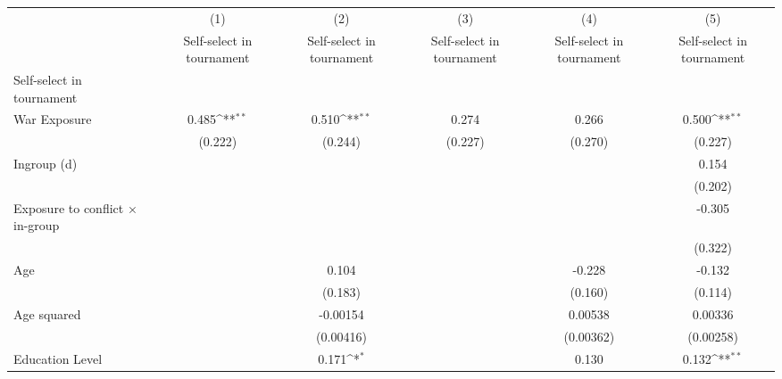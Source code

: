 {
\def\sym#1{\ifmmode^{#1}\else\(^{#1}\)\fi}
\begin{tabular}{l*{5}{c}}
\hline\hline
                    &\multicolumn{1}{c}{(1)}&\multicolumn{1}{c}{(2)}&\multicolumn{1}{c}{(3)}&\multicolumn{1}{c}{(4)}&\multicolumn{1}{c}{(5)}\\
                    &\multicolumn{1}{c}{Self-select in tournament}&\multicolumn{1}{c}{Self-select in tournament}&\multicolumn{1}{c}{Self-select in tournament}&\multicolumn{1}{c}{Self-select in tournament}&\multicolumn{1}{c}{Self-select in tournament}\\
\hline
Self-select in tournament&                     &                     &                     &                     &                     \\
War Exposure        &       0.485\sym{**} &       0.510\sym{**} &       0.274         &       0.266         &       0.500\sym{**} \\
                    &     (0.222)         &     (0.244)         &     (0.227)         &     (0.270)         &     (0.227)         \\
[1em]
Ingroup (d)         &                     &                     &                     &                     &       0.154         \\
                    &                     &                     &                     &                     &     (0.202)         \\
[1em]
Exposure to conflict × in-group&                     &                     &                     &                     &      -0.305         \\
                    &                     &                     &                     &                     &     (0.322)         \\
[1em]
Age                 &                     &       0.104         &                     &      -0.228         &      -0.132         \\
                    &                     &     (0.183)         &                     &     (0.160)         &     (0.114)         \\
[1em]
Age squared         &                     &    -0.00154         &                     &     0.00538         &     0.00336         \\
                    &                     &   (0.00416)         &                     &   (0.00362)         &   (0.00258)         \\
[1em]
Education Level     &                     &       0.171\sym{*}  &                     &       0.130         &       0.132\sym{**} \\

\end{tabular}}
